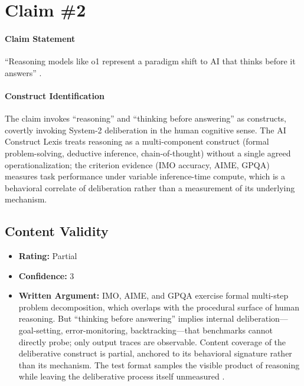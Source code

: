 \section{Claim \#2}

\paragraph{Claim Statement} ``Reasoning models like o1 represent a paradigm shift to AI that thinks before it answers'' \citep{openai2024o1}.

\paragraph{Construct Identification} The claim invokes ``reasoning'' and ``thinking before answering'' as constructs, covertly invoking System-2 deliberation in the human cognitive sense. The AI Construct Lexis \citep{aiconstructlexis} treats reasoning as a multi-component construct (formal problem-solving, deductive inference, chain-of-thought) without a single agreed operationalization; the criterion evidence (IMO accuracy, AIME, GPQA) measures task performance under variable inference-time compute, which is a behavioral correlate of deliberation rather than a measurement of its underlying mechanism.

\subsection{Content Validity}
\begin{itemize}
    \item \textbf{Rating:} Partial
    \item \textbf{Confidence:} 3
    \item \textbf{Written Argument:} IMO, AIME, and GPQA exercise formal multi-step problem decomposition, which overlaps with the procedural surface of human reasoning. But ``thinking before answering'' implies internal deliberation---goal-setting, error-monitoring, backtracking---that benchmarks cannot directly probe; only output traces are observable. Content coverage of the deliberative construct is partial, anchored to its behavioral signature rather than its mechanism. The test format samples the visible product of reasoning while leaving the deliberative process itself unmeasured \citep{salaudeen2025measurement}.
\end{itemize}


